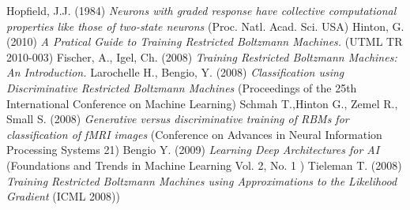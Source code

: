 \documentclass[a4paper]{scrartcl}
\begin{document}
\begin{thebibliography}{9}
    Hopfield, J.J. (1984) \emph{Neurons with graded response have collective computational properties like those of two-state neurons} (Proc. Natl. Acad. Sci. USA)
    Hinton, G. (2010) \emph{A Pratical Guide to Training Restricted Boltzmann Machines.} (UTML TR 2010-003)
    Fischer, A., Igel, Ch. (2008) \emph{Training Restricted Boltzmann Machines: An Introduction.} 
    Larochelle H., Bengio, Y. (2008) \emph {Classification using Discriminative Restricted Boltzmann Machines} (Proceedings of the 25th International Conference on Machine Learning)
    Schmah T.,Hinton G., Zemel R., Small S. (2008) \emph {Generative versus discriminative training of RBMs
for classification of fMRI images} (Conference on Advances in Neural Information Processing Systems 21)
	 Bengio Y. (2009) \emph {Learning Deep Architectures for AI} (Foundations and Trends in Machine Learning
Vol. 2, No. 1 )
	 Tieleman T. (2008) \emph {Training Restricted Boltzmann Machines using Approximations to
the Likelihood Gradient} (ICML 2008))
\end{thebibliography}
\end{document}
